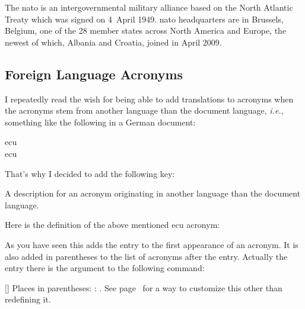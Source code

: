 \documentclass[load-preamble+,scrartcl={DIV10}]{cnltx-doc}
\newcommand*\latin{\textit}
\begin{document}
\begin{example}
  The \ac{nato} is an intergovernmental military alliance based on the
  North Atlantic Treaty which was signed on 4~April 1949. \ac{nato}
  headquarters are in Brussels, Belgium, one of the 28 member states
  across North America and Europe, the newest of which, Albania and
  Croatia, joined in April 2009.
\end{example}

\subsection{Foreign Language Acronyms}\label{ssec:foreign}
\noindent{}I repeatedly read the wish for being able to add
translations to acronyms when the acronyms stem from another language than the
document language, \latin{i.e.}, something like the following in a German 
document:
\begin{example}
  \ac{ecu}\\
  \ac{ecu}
\end{example}
That's why I decided to add the following key:
\begin{options}
    A description for an acronym originating in another language than the
    document language.
\end{options}

Here is the definition of the above mentioned \ac{ecu} acronym:
\begin{sourcecode}
\end{sourcecode}
As you have seen this adds the  entry to the first appearance
of an acronym.  It is also added in parentheses to the list of acronyms after
the  entry.  Actually the entry there is the argument to the
following command:
\begin{commands}
  []
    Places  in parentheses: :
    .  See page~\pageref{key:list-foreign-format} for a
    way to customize this other than redefining it.
\end{commands}
\end{document}
